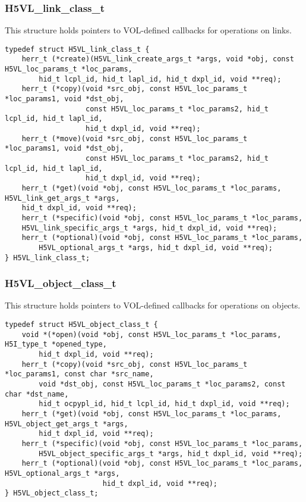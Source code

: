 \subsubsection{H5VL\_link\_class\_t}
This structure holds pointers to VOL-defined callbacks for operations on links.
\begin{verbatim}
typedef struct H5VL_link_class_t {
    herr_t (*create)(H5VL_link_create_args_t *args, void *obj, const H5VL_loc_params_t *loc_params,
        hid_t lcpl_id, hid_t lapl_id, hid_t dxpl_id, void **req);
    herr_t (*copy)(void *src_obj, const H5VL_loc_params_t *loc_params1, void *dst_obj,
                   const H5VL_loc_params_t *loc_params2, hid_t lcpl_id, hid_t lapl_id, 
                   hid_t dxpl_id, void **req);
    herr_t (*move)(void *src_obj, const H5VL_loc_params_t *loc_params1, void *dst_obj,
                   const H5VL_loc_params_t *loc_params2, hid_t lcpl_id, hid_t lapl_id, 
                   hid_t dxpl_id, void **req);
    herr_t (*get)(void *obj, const H5VL_loc_params_t *loc_params, H5VL_link_get_args_t *args, 
    hid_t dxpl_id, void **req);
    herr_t (*specific)(void *obj, const H5VL_loc_params_t *loc_params, 
    H5VL_link_specific_args_t *args, hid_t dxpl_id, void **req);
    herr_t (*optional)(void *obj, const H5VL_loc_params_t *loc_params, 
        H5VL_optional_args_t *args, hid_t dxpl_id, void **req);
} H5VL_link_class_t;
\end{verbatim}

\subsubsection{H5VL\_object\_class\_t}
This structure holds pointers to VOL-defined callbacks for operations on objects.
\begin{verbatim}
typedef struct H5VL_object_class_t {
    void *(*open)(void *obj, const H5VL_loc_params_t *loc_params, H5I_type_t *opened_type, 
        hid_t dxpl_id, void **req);
    herr_t (*copy)(void *src_obj, const H5VL_loc_params_t *loc_params1, const char *src_name, 
        void *dst_obj, const H5VL_loc_params_t *loc_params2, const char *dst_name, 
        hid_t ocpypl_id, hid_t lcpl_id, hid_t dxpl_id, void **req);
    herr_t (*get)(void *obj, const H5VL_loc_params_t *loc_params, H5VL_object_get_args_t *args, 
        hid_t dxpl_id, void **req);
    herr_t (*specific)(void *obj, const H5VL_loc_params_t *loc_params, 
        H5VL_object_specific_args_t *args, hid_t dxpl_id, void **req);
    herr_t (*optional)(void *obj, const H5VL_loc_params_t *loc_params, H5VL_optional_args_t *args,
                       hid_t dxpl_id, void **req);
} H5VL_object_class_t;
\end{verbatim}

